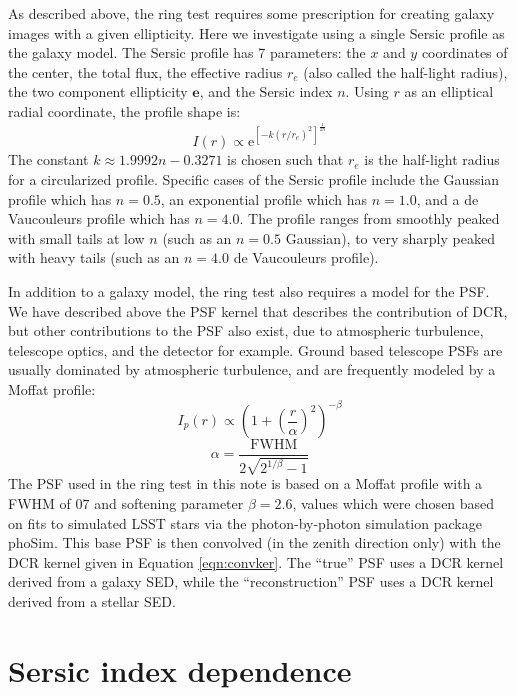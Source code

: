 \documentclass[apj]{emulateapj}
\begin{document}
As described above, the ring test requires some prescription for
creating galaxy images with a given ellipticity.  Here we investigate
using a single Sersic profile as the galaxy model.  The Sersic profile
has 7 parameters: the $x$ and $y$ coordinates of the center, the total
flux, the effective radius $r_e$ (also called the half-light radius),
the two component ellipticity $\mathbf{e}$, and the Sersic index $n$.
Using $r$ as an elliptical radial coordinate, the profile shape is:
\begin{equation}
  I(r) \propto \mathrm{e}^{[-k (r/r_e)^2]^{\frac{1}{2 n}}}
\end{equation}
The constant $k \approx 1.9992 n - 0.3271$ is chosen such that $r_e$
is the half-light radius for a circularized profile.  Specific cases
of the Sersic profile include the Gaussian profile which has $n=0.5$,
an exponential profile which has $n=1.0$, and a de Vaucouleurs profile
which has $n=4.0$.  The profile ranges from smoothly peaked with small
tails at low $n$ (such as an $n=0.5$ Gaussian), to very sharply peaked
with heavy tails (such as an $n=4.0$ de Vaucouleurs profile).

In addition to a galaxy model, the ring test also requires a model for
the PSF.  We have described above the PSF kernel that describes the
contribution of DCR, but other contributions to the PSF also exist,
due to atmospheric turbulence, telescope optics, and the detector for
example.  Ground based telescope PSFs are usually dominated by
atmospheric turbulence, and are frequently modeled by a Moffat
profile:
\begin{equation}
  I_p(r) \propto \left(1+\left(\frac{r}{\alpha}\right)^2\right)^{-\beta}
\end{equation}
\begin{equation}
  \alpha = \frac{\mathrm{FWHM}}{2\sqrt{2^{1/\beta}-1}}
\end{equation}
The PSF used in the ring test in this note is based on a Moffat
profile with a FWHM of $0$\farcs$7$ and softening parameter $\beta =
2.6$, values which were chosen based on fits to simulated LSST stars
via the photon-by-photon simulation package phoSim.  This base PSF is
then convolved (in the zenith direction only) with the DCR kernel
given in Equation \ref{eqn:convker}.  The ``true'' PSF uses a DCR
kernel derived from a galaxy SED, while the ``reconstruction'' PSF
uses a DCR kernel derived from a stellar SED.

\section{Sersic index dependence}\label{sec:sersic}
\end{document}
